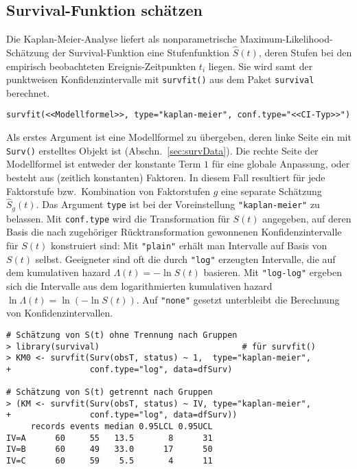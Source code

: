 
\subsection{Survival-Funktion schätzen}
\label{sec:survKMfit}

Die Kaplan-Meier-Analyse liefert als nonparametrische Maximum-Likelihood-Schätzung der Survival-Funktion eine Stufenfunktion $\hat{S}(t)$, deren Stufen bei den empirisch beobachteten Ereignis-Zeitpunkten $t_{i}$ liegen. Sie wird samt der punktweisen Konfidenzintervalle mit \lstinline!survfit()! aus dem Paket \lstinline!survival! berechnet.
\begin{lstlisting}
survfit(<<Modellformel>>, type="kaplan-meier", conf.type="<<CI-Typ>>")
\end{lstlisting}

Als erstes Argument ist eine Modellformel zu übergeben, deren linke Seite ein mit \lstinline!Surv()! erstelltes Objekt ist (Abschn.\ \ref{sec:survData}). Die rechte Seite der Modellformel ist entweder der konstante Term $1$ für eine globale Anpassung, oder besteht aus (zeitlich konstanten) Faktoren. In diesem Fall resultiert für jede Faktorstufe bzw.\ Kombination von Faktorstufen $g$ eine separate Schätzung $\hat{S}_{g}(t)$. Das Argument \lstinline!type! ist bei der Voreinstellung \lstinline!"kaplan-meier"! zu belassen. Mit \lstinline!conf.type! wird die Transformation für $S(t)$ angegeben, auf deren Basis die nach zugehöriger Rücktransformation gewonnenen Konfidenzintervalle für $S(t)$ konstruiert sind: Mit \lstinline!"plain"! erhält man Intervalle auf Basis von $S(t)$ selbst. Geeigneter sind oft die durch \lstinline!"log"! erzeugten Intervalle, die auf dem kumulativen hazard $\Lambda(t) = -\ln S(t)$ basieren. Mit \lstinline!"log-log"! ergeben sich die Intervalle aus dem logarithmierten kumulativen hazard $\ln \Lambda(t) = \ln (-\ln S(t))$. Auf \lstinline!"none"! gesetzt unterbleibt die Berechnung von Konfidenzintervallen.
\begin{lstlisting}
# Schätzung von S(t) ohne Trennung nach Gruppen
> library(survival)                             # für survfit()
> KM0 <- survfit(Surv(obsT, status) ~ 1,  type="kaplan-meier",
+                conf.type="log", data=dfSurv)

# Schätzung von S(t) getrennt nach Gruppen
> (KM <- survfit(Surv(obsT, status) ~ IV, type="kaplan-meier",
+                conf.type="log", data=dfSurv))
     records events median 0.95LCL 0.95UCL
IV=A      60     55   13.5       8      31
IV=B      60     49   33.0      17      50
IV=C      60     59    5.5       4      11
\end{lstlisting}

